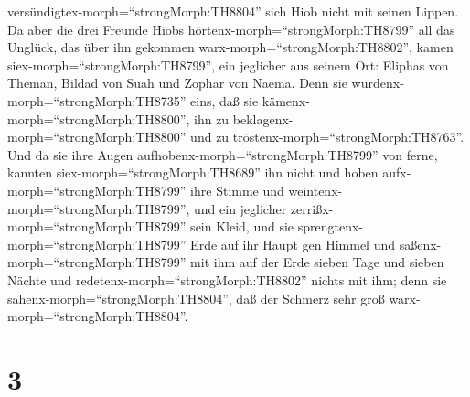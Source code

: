 versündigtex-morph=``strongMorph:TH8804'' sich Hiob nicht mit seinen
Lippen.  Da aber die drei Freunde Hiobs
hörtenx-morph=``strongMorph:TH8799'' all das Unglück, das über ihn
gekommen warx-morph=``strongMorph:TH8802'', kamen
siex-morph=``strongMorph:TH8799'', ein jeglicher aus seinem Ort: Eliphas
von Theman, Bildad von Suah und Zophar von Naema. Denn sie
wurdenx-morph=``strongMorph:TH8735'' eins, daß sie
kämenx-morph=``strongMorph:TH8800'', ihn zu
beklagenx-morph=``strongMorph:TH8800'' und zu
tröstenx-morph=``strongMorph:TH8763''.  Und da sie ihre
Augen aufhobenx-morph=``strongMorph:TH8799'' von ferne, kannten
siex-morph=``strongMorph:TH8689'' ihn nicht und hoben
aufx-morph=``strongMorph:TH8799'' ihre Stimme und
weintenx-morph=``strongMorph:TH8799'', und ein jeglicher
zerrißx-morph=``strongMorph:TH8799'' sein Kleid, und sie
sprengtenx-morph=``strongMorph:TH8799'' Erde auf ihr Haupt gen Himmel
 und saßenx-morph=``strongMorph:TH8799'' mit ihm auf der
Erde sieben Tage und sieben Nächte und
redetenx-morph=``strongMorph:TH8802'' nichts mit ihm; denn sie
sahenx-morph=``strongMorph:TH8804'', daß der Schmerz sehr groß
warx-morph=``strongMorph:TH8804''.

\hypertarget{section-2}{%
\section{3}\label{section-2}}

